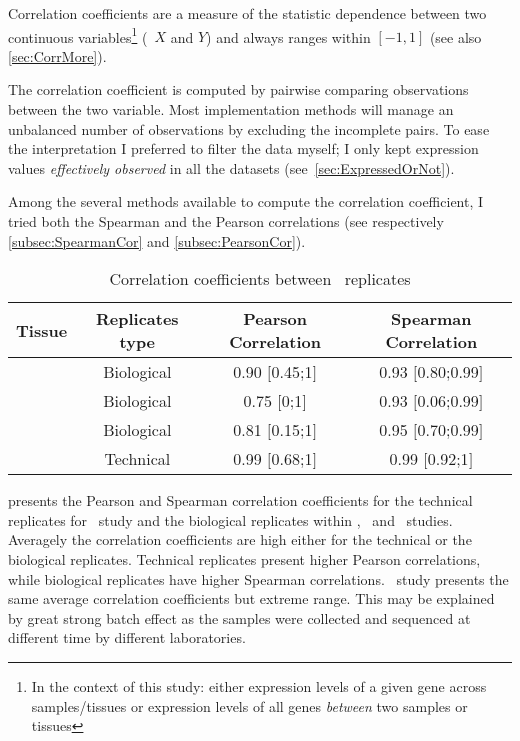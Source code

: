 Correlation coefficients are a measure of the statistic dependence between two
continuous variables\footnote{In the context of this study: either expression
levels of a given gene across samples/tissues or expression levels of all genes
\emph{between} two samples or tissues} (\eg\
$X$ and $Y$) and always ranges within $[-1,1]$ (see also \cref{sec:CorrMore}).

The correlation coefficient is computed by pairwise comparing observations
between the two variable. Most implementation methods
will manage an unbalanced number of observations by excluding the incomplete pairs.
To ease the interpretation I preferred to filter the data \latin{a priori}
myself; I only kept expression values \emph{effectively observed}
in all the datasets (see~\cref{sec:ExpressedOrNot}).

Among the several methods available to compute the correlation coefficient,
I tried both the Spearman and the Pearson correlations
(see respectively \cref{subsec:SpearmanCor} and \cref{subsec:PearsonCor}).

\begin{table}[]
\centering
\caption{Correlation coefficients between \Rnaseq\ replicates}
\label{tab:repCorr}
\begin{tabular}{@{}cccc@{}}
\toprule
Tissue & Replicates type & Pearson Correlation & Spearman Correlation \\ \midrule
\vt\ & Biological & 0.90 $[$0.45;1$]$ & 0.93 $[$0.80;0.99$]$ \\
\gtex\ & Biological &  0.75 $[$0;1$]$ & 0.93 $[$0.06;0.99$]$ \\
\uhlen\ & Biological & 0.81 $[$0.15;1$]$  &
0.95 $[$0.70;0.99$]$ \\
       & Technical & 0.99 $[$0.68;1$]$ & 0.99 $[$0.92;1$]$\\
\bottomrule
\end{tabular}
\end{table}

 presents the Pearson and Spearman correlation coefficients
for the technical replicates for \uhlen\ study and
the biological replicates within \vt, \gtex\ and \uhlen\ studies.
Averagely the correlation coefficients are high either for the technical or
the biological replicates.
Technical replicates present higher Pearson correlations,
while biological replicates have higher Spearman correlations.
\gtex\ study presents the same average correlation coefficients but extreme range.
This may be explained by great strong batch effect as the samples were collected
and sequenced at different time by different laboratories.

